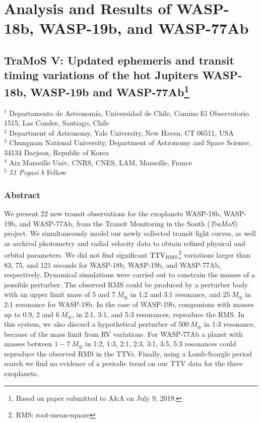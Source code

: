 \chapter{Analysis and Results of WASP-18b, WASP-19b, and WASP-77Ab}\label{chap:paper}

\section*{TraMoS V: Updated ephemeris and transit timing variations of the hot Jupiters WASP-18b, WASP-19b and WASP-77Ab\footnote{Based on paper submitted to A\&A on July 9, 2019.}}


\begin{flushleft}
\vspace{-1cm}
$^{1}$ Departamento de Astronom\'ia, Universidad de Chile, Camino El Observatorio 1515, Las Condes, Santiago, Chile \\
$^{2}$ Department of Astronomy, Yale University, New Haven, CT 06511, USA \\
$^{3}$ Chungnam National University, Department of Astronomy and Space Science, 34134 Daejeon, Republic of Korea \\ 
$^{4}$ Aix Marseille Univ, CNRS, CNES, LAM, Marseille, France \\
$^{5}$ \emph{51 Pegasi b} Fellow \\
\end{flushleft}

\subsection*{Abstract}

We present 22 new transit observations for the exoplanets WASP-18b, WASP-19b, and WASP-77Ab, from the Transit Monitoring in the South (\emph{TraMoS}) project. We simultaneously model our newly collected transit light curves, as well as archival photometry and radial velocity data to obtain refined physical and orbital parameters. We did not find significant $\rm TTV_{RMS}$\footnote{RMS: root-mean-square} variations larger than 83, 75, and 121 seconds for WASP-18b, WASP-19b, and WASP-77Ab, respectively. Dynamical simulations were carried out to constrain the masses of a possible perturber. The observed RMS could be produced by a perturber body with an upper limit mass of 5 and $7~M_{\oplus}$ in 1:2 and 3:1 resonance, and $25~M_{\oplus}$ in 2:1 resonance for WASP-18b. In the case of WASP-19b, companions with masses up to 0.9, 2 and $6~M_{\oplus}$, in 2:1, 3:1, and 5:3 resonances, reproduce the RMS. In this system, we also discard a hypothetical perturber of $500~M_{\oplus}$ in 1:3 resonance, because of the mass limit from RV variations. For WASP-77Ab a planet with masses between $1-7~M_{\oplus}$ in 1:2, 1:3, 2:1, 2:3, 3:1, 3:5, 5:3 resonances could reproduce the observed RMS in the TTVs. Finally, using a Lomb-Scargle period search we find no evidence of a periodic trend on our TTV data for the three exoplanets.

